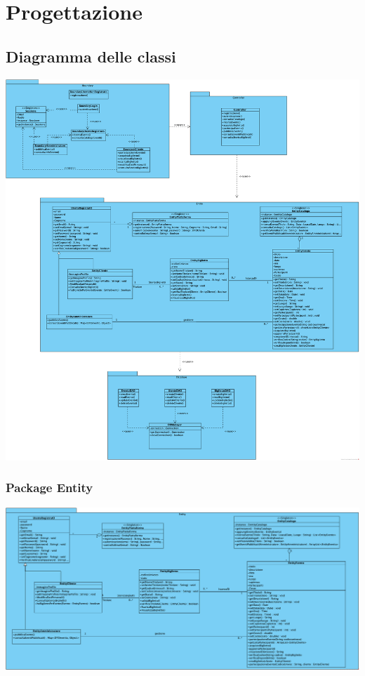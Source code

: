 \chapter{Progettazione}
\section{Diagramma delle classi }
\begin{center}	
	\vspace{1ex}
	\includegraphics[height=0.9\linewidth]{assets/package/PackageDiagramComplessivo.png}
	\vspace{1ex}
\end{center}
\subsection{Package Entity}
\begin{center}	
	\vspace{1ex}
	\includegraphics[height=0.38\linewidth]{assets/package/PackageEntity.png}
	\vspace{1ex}
\end{center}
